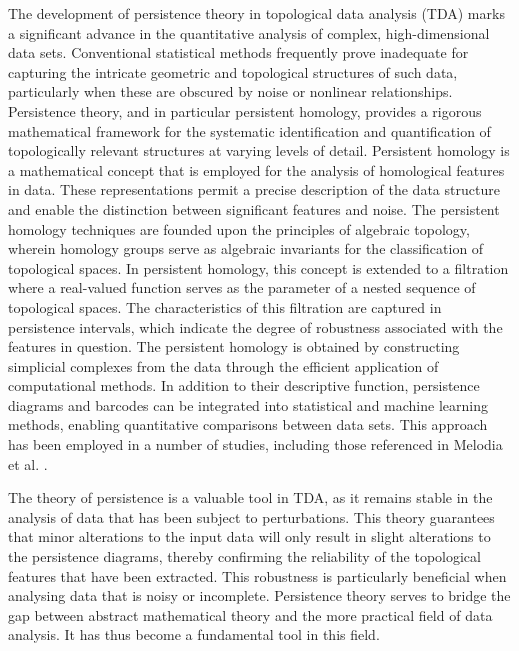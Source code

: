 The development of persistence theory in topological data analysis (TDA) marks a significant advance in the quantitative analysis of complex, high-dimensional data sets. Conventional statistical methods frequently prove inadequate for capturing the intricate geometric and topological structures of such data, particularly when these are obscured by noise or nonlinear relationships. Persistence theory, and in particular persistent homology, provides a rigorous mathematical framework for the systematic identification and quantification of topologically relevant structures at varying levels of detail. Persistent homology is a mathematical concept that is employed for the analysis of homological features in data. These representations permit a precise description of the data structure and enable the distinction between significant features and noise. The persistent homology techniques are founded upon the principles of algebraic topology, wherein homology groups serve as algebraic invariants for the classification of topological spaces. In persistent homology, this concept is extended to a filtration where a real-valued function serves as the parameter of a nested sequence of topological spaces. The characteristics of this filtration are captured in persistence intervals, which indicate the degree of robustness associated with the features in question. The persistent homology is obtained by constructing simplicial complexes from the data through the efficient application of computational methods. In addition to their descriptive function, persistence diagrams and barcodes can be integrated into statistical and machine learning methods, enabling quantitative comparisons between data sets. This approach has been employed in a number of studies, including those referenced in Melodia et al. \cite{melodia2018deep,melodia2020persistent,melodia2021estimate,melodia2021homological}.

The theory of persistence is a valuable tool in TDA, as it remains stable in the analysis of data that has been subject to perturbations. This theory guarantees that minor alterations to the input data will only result in slight alterations to the persistence diagrams, thereby confirming the reliability of the topological features that have been extracted. This robustness is particularly beneficial when analysing data that is noisy or incomplete. Persistence theory serves to bridge the gap between abstract mathematical theory and the more practical field of data analysis. It has thus become a fundamental tool in this field.

